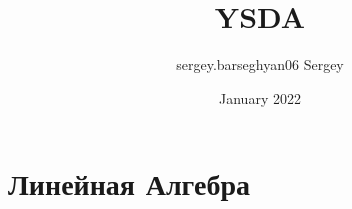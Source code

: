 \documentclass[16pt]{article}
\title{YSDA}
\author{sergey.barseghyan06 Sergey}
\date{January 2022}
\begin{document}
\maketitle

\section{Линейная Алгебра}

\begin{thm}

\end{thm}






\begin{sol}
\end{sol}
\end{document}
